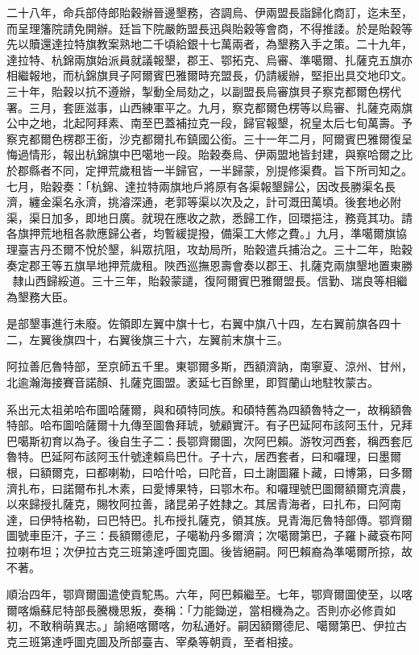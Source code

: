 \begin{pinyinscope}
二十八年，命兵部侍郎貽穀辦晉邊墾務，咨調烏、伊兩盟長詣歸化商訂，迄未至，而呈理籓院請免開辦。廷旨下院嚴飭盟長迅與貽穀等會商，不得推諉。於是貽穀等先以贖還達拉特旗教案熟地二千頃給銀十七萬兩者，為墾務入手之策。二十九年，達拉特、杭錦兩旗始派員就議報墾，郡王、鄂拓克、烏審、準噶爾、扎薩克五旗亦相繼報地，而杭錦旗貝子阿爾賓巴雅爾時充盟長，仍請緩辦，堅拒出具交地印文。三十年，貽穀以抗不遵辦，掣動全局劾之，以副盟長烏審旗貝子察克都爾色楞代署。三月，套匪滋事，山西練軍平之。九月，察克都爾色楞等以烏審、扎薩克兩旗公中之地，北起阿拜素、南至巴蓋補拉克一段，歸官報墾，祝皇太后七旬萬壽。予察克都爾色楞郡王銜，沙克都爾扎布鎮國公銜。三十一年二月，阿爾賓巴雅爾復呈悔過情形，報出杭錦旗中巴噶地一段。貽穀奏烏、伊兩盟地皆封建，與察哈爾之比於郡縣者不同，定押荒歲租皆一半歸官，一半歸蒙，別提修渠費。旨下所司知之。七月，貽穀奏：「杭錦、達拉特兩旗地戶將原有各渠報墾歸公，因改長勝渠名長濟，纏金渠名永濟，挑濬深通，老郭等渠以次及之，計可溉田萬頃。後套地必附渠，渠日加多，即地日廣。就現在應收之款，悉歸工作，回環挹注，務竟其功。請各旗押荒地租各款應歸公者，均暫緩提撥，備渠工大修之費。」九月，準噶爾旗協理臺吉丹丕爾不悅於墾，糾眾抗阻，攻劫局所，貽穀遣兵捕治之。三十二年，貽穀奏定郡王等五旗旱地押荒歲租。陜西巡撫恩壽會奏以郡王、扎薩克兩旗墾地置東勝，隸山西歸綏道。三十三年，貽穀蒙譴，復阿爾賓巴雅爾盟長。信勤、瑞良等相繼為墾務大臣。

是部墾事進行未廢。佐領即左翼中旗十七，右翼中旗八十四，左右翼前旗各四十二，左翼後旗四十，右翼後旗三十六，左翼前末旗十三。

阿拉善厄魯特部，至京師五千里。東鄂爾多斯，西額濟訥，南寧夏、涼州、甘州，北逾瀚海接賽音諾顏、扎薩克圖盟。袤延七百餘里，即賀蘭山地駐牧蒙古。

系出元太祖弟哈布圖哈薩爾，與和碩特同族。和碩特舊為四額魯特之一，故稱額魯特部。哈布圖哈薩爾十九傳至圖魯拜琥，號顧實汗。有子巴延阿布該阿玉什，兄拜巴噶斯初育以為子。後自生子二：長鄂齊爾圖，次阿巴賴。游牧河西套，稱西套厄魯特。巴延阿布該阿玉什號達賴烏巴什。子十六，居西套者，曰和囉理，曰墨爾根，曰額爾克，曰都喇勒，曰哈什哈，曰陀音，曰土謝圖羅卜藏，曰博第，曰多爾濟扎布，曰諾爾布扎木素，曰愛博果特，曰鄂木布。和囉理號巴圖爾額爾克濟農，以來歸授扎薩克，賜牧阿拉善，諸昆弟子姓隸之。其居青海者，曰扎布，曰阿南達，曰伊特格勒，曰巴特巴。扎布授扎薩克，領其族。見青海厄魯特部傳。鄂齊爾圖號車臣汗，子三：長額爾德尼，子噶勒丹多爾濟；次噶爾第巴，子羅卜藏袞布阿拉喇布坦；次伊拉古克三班第達呼圖克圖。後皆絕嗣。阿巴賴裔為準噶爾所掠，故不著。

順治四年，鄂齊爾圖遣使貢駝馬。六年，阿巴賴繼至。七年，鄂齊爾圖使至，以喀爾喀煽蘇尼特部長騰機思叛，奏稱：「力能鋤逆，當相機為之。否則亦必修貢如初，不敢稍萌異志。」諭絕喀爾喀，勿私通好。嗣因額爾德尼、噶爾第巴、伊拉古克三班第達呼圖克圖及所部臺吉、宰桑等朝貢，至者相接。


\end{pinyinscope}
